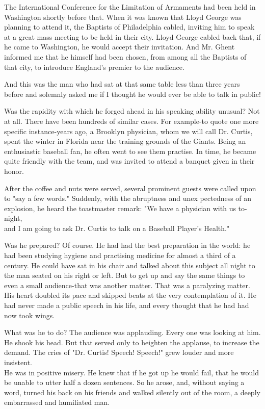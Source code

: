 \documentclass[10pt]{article}
\begin{document}
The International Conference for the Limitation of Armaments had been held in Washington shortly before that. When it was known that Lloyd George was planning to attend it, the Baptists of Philadelphia cabled, inviting him to speak at a great mass meeting to be held in their city. Lloyd George cabled back that, if he came to Washington, he would accept their invitation. And Mr. Ghent informed me that he himself had been chosen, from among all the Baptists of that city, to introduce England's premier to the audience.

And this was the man who had sat at that same table less than three years before and solemnly asked me if I thought he would ever be able to talk in public!

Was the rapidity with which he forged ahead in his speaking ability unusual? Not at all. There have been hundreds of similar cases. For example-to quote one more specific instance-years ago, a Brooklyn physician, whom we will call Dr. Curtis, spent the winter in Florida near the training grounds of the Giants. Being an enthusiastic baseball fan, he often went to see them practise. In time, he became quite friendly with the team, and was invited to attend a banquet given in their honor.

After the coffee and nuts were served, several prominent guests were called upon to "say a few words." Suddenly, with the abruptness and unex pectedness of an explosion, he heard the toastmaster remark: "We have a physician with us to-night,\\
and I am going to ask Dr. Curtis to talk on a Baseball Player's Health."

Was he prepared? Of course. He had had the best preparation in the world: he had been studying hygiene and practising medicine for almost a third of a century. He could have sat in his chair and talked about this subject all night to the man seated on his right or left. But to get up and say the same things to even a small audience-that was another matter. That was a paralyzing matter. His heart doubled its pace and skipped beats at the very contemplation of it. He had never made a public speech in his life, and every thought that he had had now took wings.

What was he to do? The audience was applauding. Every one was looking at him. He shook his head. But that served only to heighten the applause, to increase the demand. The cries of "Dr. Curtis! Speech! Speech!" grew louder and more insistent.\\
He was in positive misery. He knew that if he got up he would fail, that he would be unable to utter half a dozen sentences. So he arose, and, without saying a word, turned his back on his friends and walked silently out of the room, a deeply embarrassed and humiliated man.
\end{document}

